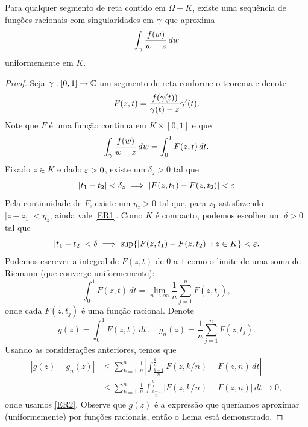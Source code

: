     \begin{lema}
    \label{LR2}
        Para qualquer segmento de reta contido em $\Omega - K$, existe uma sequência 
        de funções racionais com singularidades em $\gamma$ que aproxima
        \begin{equation*}
        \int_\gamma \frac{f(w)}{w-z}\,dw
        \end{equation*}
        uniformemente em $K$.
    \end{lema}
    \begin{proof}
        Seja $\gamma : [0,1] \to \mathbb{C}$ um segmento de reta conforme o teorema e denote
        \begin{equation*}
            F(z,t) = \frac{f(\gamma(t))}{\gamma(t) - z}\gamma'(t).
        \end{equation*}
        Note que $F$ é uma função contínua em $K \times [0,1]$ e que
        \begin{equation*}
            \int_\gamma \frac{f(w)}{w-z}\,dw = \int_{0}^{1}F(z,t)\,dt.
        \end{equation*}
        Fixado $z \in K$ e dado $\varepsilon > 0$, existe um $\delta_z > 0$ tal que
        \begin{equation}
        \label{ER1}
            |t_1 - t_2| < \delta_z \implies |F(z,t_1) - F(z,t_2)| < \varepsilon
        \end{equation}
        Pela continuidade de $F$, existe um $\eta_z > 0$ tal que, para $z_1$ satisfazendo 
        $|z-z_1| < \eta_z$, ainda vale \eqref{ER1}. Como $K$ é compacto, podemos escolher 
        um $\delta > 0$ tal que
        \begin{equation}
        \label{ER2}
            |t_1 - t_2| < \delta \implies \sup \{|F(z,t_1) - F(z,t_2)| : z \in K\} < \varepsilon.   
        \end{equation}
        Podemos escrever a integral de $F(z,t)$ de $0$ a $1$ como o limite de uma soma de Riemann 
        (que converge uniformemente):
        \begin{equation*}
            \int_{0}^{1}F(z,t) \, dt = \lim_{n \to \infty}\frac{1}{n}\sum_{j=1}^{n}F(z,t_j),
        \end{equation*}
        onde cada $F(z,t_j)$ é uma função racional. Denote
        \begin{equation*}
            g(z) = \int_{0}^{1}F(z,t) \, dt \, ,  \ \ \ \ g_n(z) = \frac{1}{n}\sum_{j=1}^{n}F(z,t_j).
        \end{equation*}
        Usando as considerações anteriores, temos que 
        \begin{align*}
            |g(z) - g_n(z)| 
            &\leq 
            \sum_{k=1}^{n}\frac{1}{n}\left|\int_{\frac{k-1}{n}}^{\frac{k}{n}}F(z,k/n) - F(z,n) \, dt \right| \\
            &\leq \sum_{k=1}^{n}\frac{1}{n}\int_{\frac{k-1}{n}}^{\frac{k}{n}}|F(z,k/n) - F(z,n)| \, dt
            \to 0,
        \end{align*}
        onde usamos \eqref{ER2}. Observe que $g(z)$ é a expressão que queríamos aproximar
        (uniformemente) por funções racionais, então o Lema está demonstrado.
    \end{proof}
